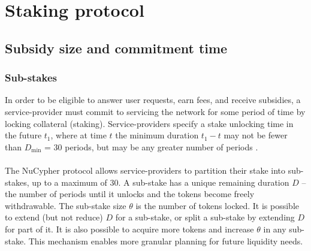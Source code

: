 \documentclass[longbibliography,nofootinbib]{revtex4-1}
\begin{document}
\section{Staking protocol}

\subsection{Subsidy size and commitment time}

\subsubsection{Sub-stakes}

In order to be eligible to answer user requests, earn fees, and receive subsidies, a service-provider must commit to servicing the network for some period of time by locking collateral (staking). Service-providers specify a stake unlocking time in the future $t_1$, where at time $t$ the minimum duration $t_1 - t$ may not be fewer than $D_{\min}$ = 30 periods, but may be any greater number of periods .
\\\\
The NuCypher protocol allows service-providers to partition their stake into sub-stakes, up to a maximum of 30. A sub-stake has a unique remaining duration $D$ – the number of periods until it unlocks and the tokens become freely withdrawable. The sub-stake size $\theta$ is the number of tokens locked. It is possible to extend (but not reduce) $D$ for a sub-stake, or split a sub-stake by extending $D$ for part of it. It is also possible to acquire more tokens and increase $\theta$ in any sub-stake. This mechanism enables more granular planning for future liquidity needs. 
\end{document}
